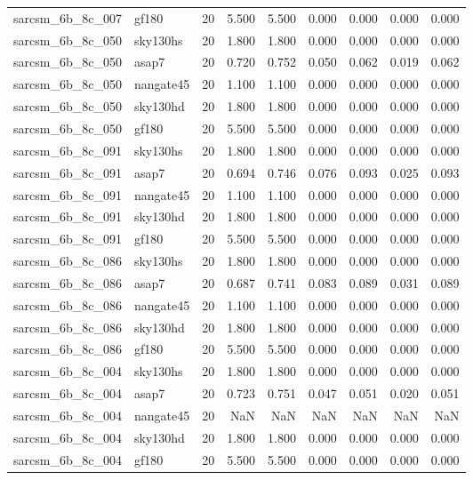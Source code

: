 \begin{tabular}{llrrrrrrr}
sarcsm\_6b\_8c\_007 & gf180 & 20 & 5.500 & 5.500 & 0.000 & 0.000 & 0.000 & 0.000 \\
sarcsm\_6b\_8c\_050 & sky130hs & 20 & 1.800 & 1.800 & 0.000 & 0.000 & 0.000 & 0.000 \\
sarcsm\_6b\_8c\_050 & asap7 & 20 & 0.720 & 0.752 & 0.050 & 0.062 & 0.019 & 0.062 \\
sarcsm\_6b\_8c\_050 & nangate45 & 20 & 1.100 & 1.100 & 0.000 & 0.000 & 0.000 & 0.000 \\
sarcsm\_6b\_8c\_050 & sky130hd & 20 & 1.800 & 1.800 & 0.000 & 0.000 & 0.000 & 0.000 \\
sarcsm\_6b\_8c\_050 & gf180 & 20 & 5.500 & 5.500 & 0.000 & 0.000 & 0.000 & 0.000 \\
sarcsm\_6b\_8c\_091 & sky130hs & 20 & 1.800 & 1.800 & 0.000 & 0.000 & 0.000 & 0.000 \\
sarcsm\_6b\_8c\_091 & asap7 & 20 & 0.694 & 0.746 & 0.076 & 0.093 & 0.025 & 0.093 \\
sarcsm\_6b\_8c\_091 & nangate45 & 20 & 1.100 & 1.100 & 0.000 & 0.000 & 0.000 & 0.000 \\
sarcsm\_6b\_8c\_091 & sky130hd & 20 & 1.800 & 1.800 & 0.000 & 0.000 & 0.000 & 0.000 \\
sarcsm\_6b\_8c\_091 & gf180 & 20 & 5.500 & 5.500 & 0.000 & 0.000 & 0.000 & 0.000 \\
sarcsm\_6b\_8c\_086 & sky130hs & 20 & 1.800 & 1.800 & 0.000 & 0.000 & 0.000 & 0.000 \\
sarcsm\_6b\_8c\_086 & asap7 & 20 & 0.687 & 0.741 & 0.083 & 0.089 & 0.031 & 0.089 \\
sarcsm\_6b\_8c\_086 & nangate45 & 20 & 1.100 & 1.100 & 0.000 & 0.000 & 0.000 & 0.000 \\
sarcsm\_6b\_8c\_086 & sky130hd & 20 & 1.800 & 1.800 & 0.000 & 0.000 & 0.000 & 0.000 \\
sarcsm\_6b\_8c\_086 & gf180 & 20 & 5.500 & 5.500 & 0.000 & 0.000 & 0.000 & 0.000 \\
sarcsm\_6b\_8c\_004 & sky130hs & 20 & 1.800 & 1.800 & 0.000 & 0.000 & 0.000 & 0.000 \\
sarcsm\_6b\_8c\_004 & asap7 & 20 & 0.723 & 0.751 & 0.047 & 0.051 & 0.020 & 0.051 \\
sarcsm\_6b\_8c\_004 & nangate45 & 20 & NaN & NaN & NaN & NaN & NaN & NaN \\
sarcsm\_6b\_8c\_004 & sky130hd & 20 & 1.800 & 1.800 & 0.000 & 0.000 & 0.000 & 0.000 \\
sarcsm\_6b\_8c\_004 & gf180 & 20 & 5.500 & 5.500 & 0.000 & 0.000 & 0.000 & 0.000 \\

\end{tabular}

